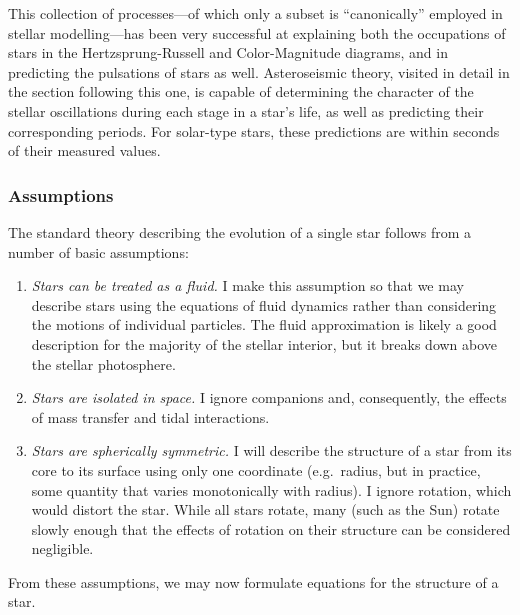 This collection of processes---of which only a subset is ``canonically'' employed in stellar modelling---has been very successful at explaining both the occupations of stars in the Hertzsprung-Russell and Color-Magnitude diagrams, and in predicting the pulsations of stars as well. 
Asteroseismic theory, visited in detail in the section following this one, is capable of determining the character of the stellar oscillations during each stage in a star's life, as well as predicting their corresponding periods. For solar-type stars, these predictions are within seconds of their measured values. 


\subsubsection*{Assumptions}
The standard theory describing the evolution of a single star follows from a number of basic assumptions:
\begin{enumerate}%
    \item \emph{Stars can be treated as a fluid.} 
    I make this assumption so that we may describe stars using the equations of fluid dynamics rather than considering the motions of individual particles. 
    The fluid approximation is likely a good description for the majority of the stellar interior, but it breaks down above the stellar photosphere. 
    \item \emph{Stars are isolated in space.} 
    I ignore companions and, consequently, the effects of mass transfer and tidal interactions. 
    \item \emph{Stars are spherically symmetric.} 
    I will describe the structure of a star from its core to its surface using only one coordinate (e.g.~radius, but in practice, some quantity that varies monotonically with radius). 
    I ignore rotation, which would distort the star. 
    While all stars rotate, many (such as the Sun) rotate slowly enough that the effects of rotation on their structure can be considered negligible. 
\end{enumerate}
From these assumptions, we may now formulate equations for the structure of a star. 

